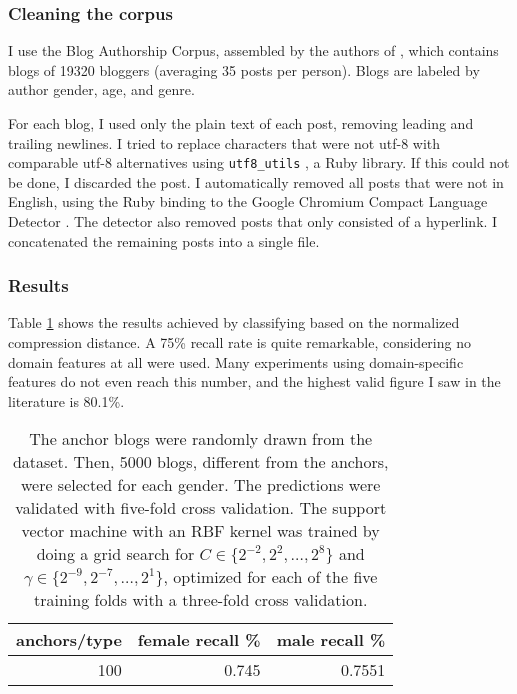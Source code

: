 \subsubsection{Cleaning the corpus}

I use the Blog Authorship Corpus, assembled by the authors of \cite{Schler2005}, which contains blogs of 19320 bloggers (averaging 35 posts per person). Blogs are labeled by author gender, age, and genre.

For each blog, I used only the plain text of each post, removing leading and trailing newlines. I tried to replace characters that were not utf-8 with comparable utf-8 alternatives using \lstinline{utf8_utils} \cite{utf8_utils}, a Ruby library. If this could not be done, I discarded the post. I automatically removed all posts that were not in English, using the Ruby binding \cite{ruby_cld} to the Google Chromium Compact Language Detector \cite{google_cld}. The detector also removed posts that only consisted of a hyperlink. I concatenated the remaining posts into a single file.

\subsubsection{Results}
Table \ref{table:female_male_precision} shows the results achieved by classifying based on the normalized compression distance. A 75\% recall rate is quite remarkable, considering no domain features at all were used. Many experiments using domain-specific features do not even reach this number, and the highest valid figure I saw in the literature is 80.1\%.

\begin{table}[h]
\begin{tabular}{rrr}
\hline
   anchors/type &   female recall \% &   male recall \% \\
\hline
            100 &             0.745 &          0.7551 \\
\hline
\end{tabular}
\caption{
The anchor blogs were randomly drawn from the dataset. Then, 5000 blogs, different from the anchors, were selected for each gender.
The predictions were validated with five-fold cross validation.
The support vector machine with an RBF kernel was trained by doing a grid search
for $C \in \{ 2^{-2}, 2^{2}, \dots, 2^{8} \}$ and $\gamma \in \{2^{-9},
2^{-7}, \dots, 2^{1} \}$, optimized for each of the five training folds with a three-fold
cross validation. }
\label{table:female_male_precision}
\end{table}

